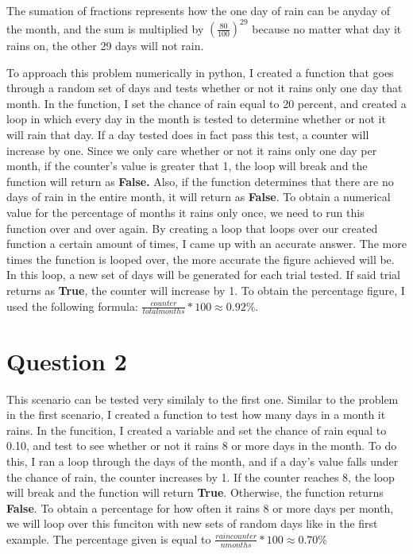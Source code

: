 \documentclass[twocolumn]{revtex4}
\begin{document}
The sumation of fractions represents how the one day of rain can be anyday of the month, and the sum is multiplied by $(\frac{80}{100}) ^{29} $ because no matter what day it rains on, the other 29 days will not rain.


To approach this problem numerically in python, I created a function that goes through a random set of days and tests whether or not it rains only one day that month.  In the function, I set the chance of rain equal to 20 percent, and created a loop in which every day in the month is tested to determine whether or not it will rain that day. If a day tested does in fact pass this test, a counter will increase by one.  Since we only care whether or not it rains only one day per month, if the counter's value is greater that 1, the loop will break and the function will return as \textbf{False.}  Also, if the function determines that there are no days of rain in the entire month, it will return as \textbf{False}.  To obtain a numerical value for the percentage of months it rains only once, we need to run this function over and over again.  By creating a loop that loops over our created function a certain amount of times, I came up with an accurate answer.  The more times the function is looped over, the more accurate the figure achieved will be.  In this loop, a new set of days will be generated for each trial tested.  If said trial returns as \textbf{True}, the counter will increase by 1.  To obtain the percentage figure, I used the following formula: $ \frac{counter}{total months} * 100 \approx 0.92 \% $. 

\section{Question 2}

This scenario can be tested very similaly to the first one.   Similar to the problem in the first scenario, I created a function to test how many days in a month it rains.  In the funcition, I created a variable and set the chance of rain equal to 0.10, and test to see whether or not it rains 8 or more days in the month.  To do this, I ran a loop through the days of the month, and if a day's value falls under the chance of rain, the counter increases by 1.  If the counter reaches 8, the loop will break and the function will return \textbf{True}.  Otherwise, the function returns \textbf{False}.  To obtain a percentage for how often it rains 8 or more days per month, we will loop over this funciton with new sets of random days like in the first example.  The percentage given is equal to $ \frac{raincounter}{nmonths} * 100 \approx  0.70 \% $
\end{document}
